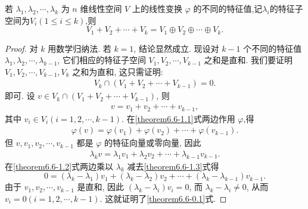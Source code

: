 \documentclass[../../main.tex]{subfiles}%
\begin{document}
\begin{theorem}\label{theorem:不同特征值的特征子空间的和必是直和}
若 $\lambda_1, \lambda_2, \cdots, \lambda_k$ 为 $n$ 维线性空间 $V$ 上的线性变换 $\varphi$ 的不同的特征值,记$\lambda_i$的特征子空间为$V_i(1\leqslant  i\leqslant  k)$,则
\[
V_1 + V_2 + \cdots + V_k = V_1 \oplus V_2 \oplus \cdots \oplus V_k.
\]
\end{theorem}
\begin{proof}

对 $k$ 用数学归纳法. 若 $k = 1$, 结论显然成立. 现设对 $k - 1$ 个不同的特征值 $\lambda_1, \lambda_2, \cdots, \lambda_{k-1}$, 它们相应的特征子空间 $V_1, V_2, \cdots, V_{k-1}$ 之和是直和. 我们要证明 $V_1, V_2, \cdots, V_{k-1}, V_k$ 之和为直和, 这只需证明:
\begin{align}\label{theorem6.6-0.1}
V_k \cap (V_1 + V_2 + \cdots + V_{k-1}) = 0.
\end{align}
即可. 设 $v \in V_k \cap (V_1 + V_2 + \cdots + V_{k-1})$, 则
\begin{align}\label{theorem6.6-1.1}
v = v_1 + v_2 + \cdots + v_{k-1},
\end{align}
其中 $v_i \in V_i (i = 1, 2,\cdots, k - 1)$. 在\eqref{theorem6.6-1.1}式两边作用 $\varphi$,得
\begin{align}\label{theorem6.6-1.2}
\varphi(v) = \varphi(v_1) + \varphi(v_2) + \cdots + \varphi(v_{k-1}).   
\end{align}
但 $v, v_1, v_2, \cdots, v_{k-1}$ 都是 $\varphi$ 的特征向量或零向量, 因此
\begin{align}\label{theorem6.6-1.3}
\lambda_k v = \lambda_1 v_1 + \lambda_2 v_2 + \cdots + \lambda_{k-1} v_{k-1}.    
\end{align}
在\eqref{theorem6.6-1.2}式两边乘以 $\lambda_k$ 减去\eqref{theorem6.6-1.3}式得
\[
0 = (\lambda_k - \lambda_1) v_1 + (\lambda_k - \lambda_2) v_2 + \cdots + (\lambda_k - \lambda_{k-1}) v_{k-1}.
\]
由于 $v_1, v_2, \cdots, v_{k-1}$ 是直和, 因此 $(\lambda_k - \lambda_i) v_i = 0$, 而 $\lambda_k - \lambda_i \neq 0$, 从而 $v_i = 0 (i = 1, 2, \cdots, k - 1)$. 这就证明了\eqref{theorem6.6-0.1}式.

\end{proof}
\end{document}
